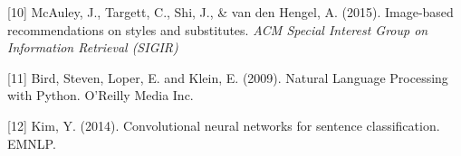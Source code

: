\documentclass{article} %
\begin{document}
{%



[10] McAuley, J., Targett, C., Shi, J., \& van den Hengel, A. (2015). Image-based recommendations on styles and substitutes. {\it ACM Special Interest Group on Information Retrieval (SIGIR)}

[11] Bird, Steven, Loper, E. and Klein, E. (2009). Natural Language Processing with Python. O'Reilly Media Inc.

[12] Kim, Y. (2014). Convolutional neural networks for sentence classification. EMNLP.



%
%



}
\end{document}
